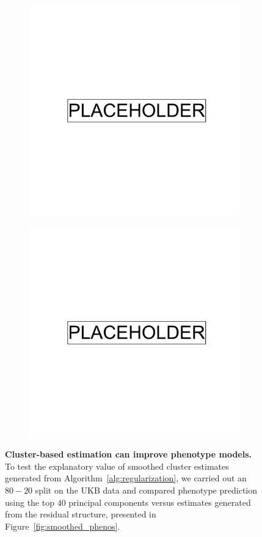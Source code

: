 \begin{figure}[!ht]
  \centering
  \begin{subfigure}[b]{0.7\linewidth}
    \includegraphics[width=0.5\linewidth]{placeholder.png}
    \caption{}
    \label{fig:wabc_pheno_model}
  \end{subfigure}
    \begin{subfigure}[b]{0.7\linewidth}
    \includegraphics[width=0.5\linewidth]{placeholder.png}
    \caption{}
    \label{fig:waba_pheno_model}
  \end{subfigure}
  \caption[MSE of cluster-based phenotype estimation]{\textbf{Cluster-based estimation can improve phenotype models.} To test the explanatory value of smoothed cluster estimates generated from Algorithm~\ref{alg:regularization}, we carried out an $80-20$ split on the UKB data and compared phenotype prediction using the top $40$ principal components versus estimates generated from the residual structure, presented in Figure~\ref{fig:smoothed_phenos}.}
  \label{fig:pheno_models}
\end{figure}

